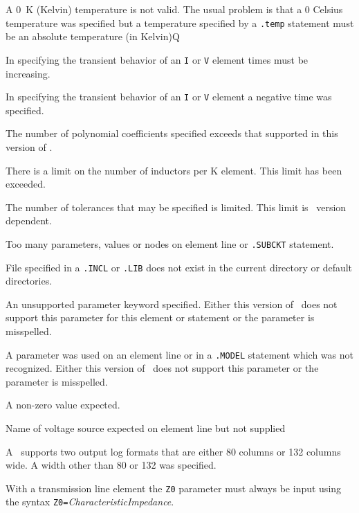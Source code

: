 A 0~K (Kelvin) temperature is not valid.
The usual problem is that a 0 Celsius temperature was specified but
a temperature specified by a {\tt .temp} statement must be an
absolute temperature (in Kelvin)Q

In specifying the transient behavior of an {\tt I} or {\tt V}
element times must be increasing.

In specifying the transient behavior of an {\tt I} or {\tt V}
element a negative time was specified.

The number of polynomial coefficients specified exceeds that
supported in this version of \spice.

There is a limit on the number of inductors per K element.
This limit has been exceeded.

The number of tolerances that may be specified is limited.  This
limit is \spice\ version dependent.

Too many parameters, values or nodes on element line or {\tt .SUBCKT} statement.

File specified in a {\tt .INCL} or {\tt .LIB} does not exist in the current
directory or default directories.

An unsupported parameter keyword specified. Either this version of
\spice\ does not support this parameter for this element or statement
or the parameter is misspelled.

A parameter was used on an element line or in a {\tt .MODEL}
statement which was not recognized. Either this version of
\spice\ does not support this parameter or the parameter is misspelled.

A non-zero value expected.

Name of voltage source expected on element line but not supplied

A \spice\ supports two output log formats that are either 80 columns
or 132 columns wide.  A width other than 80 or 132 was specified.

With a transmission line element the {\tt Z0} parameter must
always be input using the syntax {\tt Z0=}{\it CharacteristicImpedance}.

%
%
%
%
%
